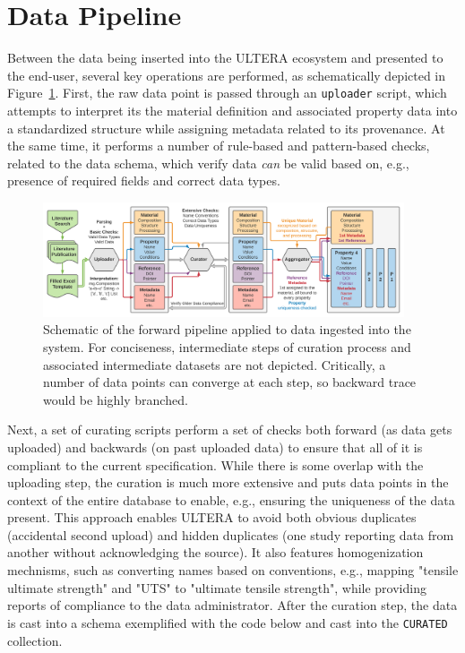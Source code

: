 \section{Data Pipeline} \label{ultera:sec:pipeline}

Between the data being inserted into the ULTERA ecosystem and presented to the end-user, several key operations are performed, as schematically depicted in Figure~\ref{ultera:fig:datapipeline}. First, the raw data point is passed through an \texttt{uploader} script, which attempts to interpret its the material definition and associated property data into a standardized structure while assigning metadata related to its provenance. At the same time, it performs a number of rule-based and pattern-based checks, related to the data schema, which verify data \emph{can} be valid based on, e.g., presence of required fields and correct data types.


\begin{figure}[H]
    \centering
    \includegraphics[width=0.95\textwidth]{ultera/ULTERA Data Detail.png}
    \caption{Schematic of the forward pipeline applied to data ingested into the system. For conciseness, intermediate steps of curation process and associated intermediate datasets are not depicted. Critically, a number of data points can converge at each step, so backward trace would be highly branched.}
    \label{ultera:fig:datapipeline}
\end{figure}

Next, a set of curating scripts perform a set of checks both forward (as data gets uploaded) and backwards (on past uploaded data) to ensure that all of it is compliant to the current specification. While there is some overlap with the uploading step, the curation is much more extensive and puts data points in the context of the entire database to enable, e.g., ensuring the uniqueness of the data present. This approach enables ULTERA to avoid both obvious duplicates (accidental second upload) and hidden duplicates (one study reporting data from another without acknowledging the source). It also features homogenization mechnisms, such as converting names based on conventions, e.g., mapping "tensile ultimate strength" and "UTS" to "ultimate tensile strength", while providing reports of compliance to the data administrator. After the curation step, the data is cast into a schema exemplified with the code below and cast into the \texttt{CURATED} collection.

